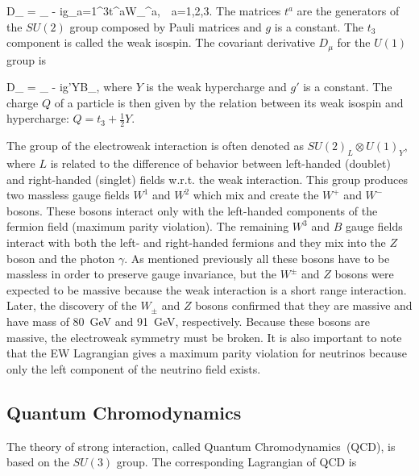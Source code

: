 {
   D_{\mu} = \partial_{\mu} - ig\sum_{a=1}^{3}t^{a}W_{\mu}^{a},~~a=1,2,3.
}
The matrices $t^{a}$ are the generators of the $SU(2)$ group composed by Pauli matrices and $g$ is a constant. The $t_{3}$ component is called the weak isospin. The covariant derivative $D_{\mu}$ for the $U(1)$ group is

{
   D_{\mu} = \partial_{\mu} - ig'YB_{\mu},
}
where $Y$ is the weak hypercharge and $g'$ is a constant. The charge $Q$ of a particle is then given by the relation between its weak isospin and hypercharge: $Q= t_{3} + \frac{1}{2}Y$.


The group of the electroweak interaction is often denoted as $SU(2)_{L} \otimes U(1)_{Y}$, where $L$ is related to the difference of behavior between left-handed (doublet) and right-handed (singlet) fields w.r.t. the weak interaction. This group produces two massless gauge fields $W^{1}$ and $W^2$ which mix and create the $W^{+}$ and $W^{-}$ bosons. These bosons interact only with the left-handed components of the fermion field (maximum parity violation). The remaining $W^{3}$ and $B$ gauge fields interact with both the left- and right-handed fermions and they mix into the $Z$ boson and the photon $\gamma$. As mentioned previously all these bosons have to be massless in order to preserve gauge invariance, but the $W^{\pm}$ and $Z$ bosons were expected to be massive because the weak interaction is a short range interaction. Later, the discovery of the $W_{\pm}$ and $Z$ bosons confirmed that they are massive and have mass of 80~GeV and 91~GeV, respectively. Because these bosons are massive, the electroweak symmetry must be broken. It is also important to note that the EW Lagrangian gives a maximum parity violation for neutrinos because only the left component of the neutrino field exists.


\subsection{Quantum Chromodynamics}

The theory of strong interaction, called Quantum Chromodynamics~(QCD), is based on the $SU(3)$ group. The corresponding Lagrangian of QCD is

